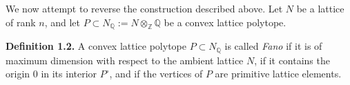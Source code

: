 We now attempt to reverse the construction described above. Let $N$ be a lattice of rank $n$, and let $P\subset{N_{\mathbb{Q}}}:=N\otimes_\mathbb{Z}\mathbb{Q}$ be a convex lattice polytope.
\par\noindent\textbf{Definition 1.2.} 
A convex lattice polytope $P\subset{N_{\mathbb{Q}}}$ is called \emph{Fano} if it is of maximum dimension with respect to the ambient lattice $N$, if it contains the origin $0$ in its interior ${P}^{\circ}$, and if the vertices of $P$ are primitive lattice elements. 

\par
